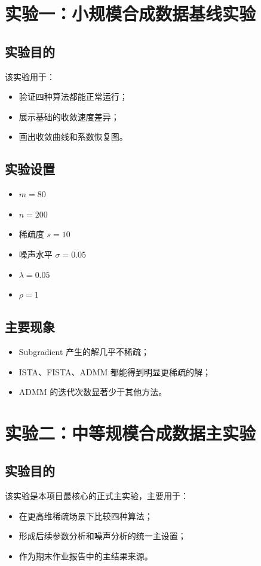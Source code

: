 \documentclass[12pt,a4paper]{ctexart}
\begin{document}
\section{实验一：小规模合成数据基线实验}
\subsection{实验目的}
该实验用于：
\begin{itemize}[leftmargin=2em]
    \item 验证四种算法都能正常运行；
    \item 展示基础的收敛速度差异；
    \item 画出收敛曲线和系数恢复图。
\end{itemize}

\subsection{实验设置}
\begin{itemize}[leftmargin=2em]
    \item $m=80$
    \item $n=200$
    \item 稀疏度 $s=10$
    \item 噪声水平 $\sigma=0.05$
    \item $\lambda=0.05$
    \item $\rho=1$
\end{itemize}

\subsection{主要现象}
\begin{itemize}[leftmargin=2em]
    \item Subgradient 产生的解几乎不稀疏；
    \item ISTA、FISTA、ADMM 都能得到明显更稀疏的解；
    \item ADMM 的迭代次数显著少于其他方法。
\end{itemize}

\section{实验二：中等规模合成数据主实验}
\subsection{实验目的}
该实验是本项目最核心的正式主实验，主要用于：
\begin{itemize}[leftmargin=2em]
    \item 在更高维稀疏场景下比较四种算法；
    \item 形成后续参数分析和噪声分析的统一主设置；
    \item 作为期末作业报告中的主结果来源。
\end{itemize}
\end{document}
